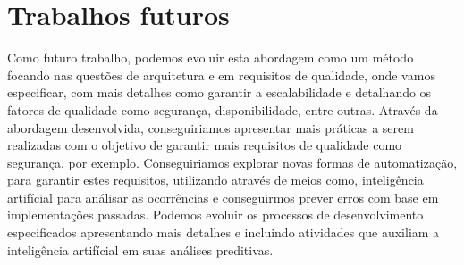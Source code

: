   \section{Trabalhos futuros}
    Como futuro trabalho, podemos evoluir esta abordagem como um método focando
    nas questões de arquitetura e em requisitos de qualidade, onde vamos especificar,
    com mais detalhes como garantir a escalabilidade e detalhando os fatores de
    qualidade como segurança, disponibilidade, entre outras. Através da abordagem
    desenvolvida, conseguiriamos apresentar mais práticas a serem realizadas com
    o objetivo de garantir mais requisitos de qualidade como segurança, por exemplo.
    Conseguiriamos explorar novas formas de automatização, para garantir estes
    requisitos, utilizando através de meios como, inteligência artifícial para
    análisar as ocorrências e conseguirmos prever erros com base em implementações
    passadas. Podemos evoluir os processos de desenvolvimento especificados
    apresentando mais detalhes e incluindo atividades que auxiliam a inteligência
    artifícial em suas análises preditivas.
